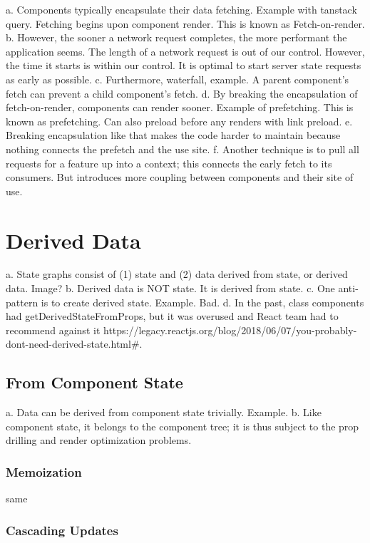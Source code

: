 \documentclass{article}
\begin{document}
a. Components typically encapsulate their data fetching. Example with tanstack query. Fetching begins upon component render. This is known as Fetch-on-render.
b. However, the sooner a network request completes, the more performant the application seems. The length of a network request is out of our control. However, the time it starts is within our control. It is optimal to start server state requests as early as possible.
c. Furthermore, waterfall, example. A parent component's fetch can prevent a child component's fetch.
d. By breaking the encapsulation of fetch-on-render, components can render sooner. Example of prefetching. This is known as prefetching. Can also preload before any renders with link preload.
e. Breaking encapsulation like that makes the code harder to maintain because nothing connects the prefetch and the use site.
f. Another technique is to pull all requests for a feature up into a context; this connects the early fetch to its consumers. But introduces more coupling between components and their site of use.

\section{Derived Data}

a. State graphs consist of (1) state and (2) data derived from state, or derived data. Image?
b. Derived data is NOT state. It is derived from state.
c. One anti-pattern is to create derived state. Example. Bad.
d. In the past, class components had getDerivedStateFromProps, but it was overused and React team had to recommend against it https://legacy.reactjs.org/blog/2018/06/07/you-probably-dont-need-derived-state.html#.

\subsection{From Component State}

a. Data can be derived from component state trivially. Example.
b. Like component state, it belongs to the component tree; it is thus subject to the prop drilling and render optimization problems.

\subsubsection{Memoization}

same

\subsubsection{Cascading Updates}
\end{document}
